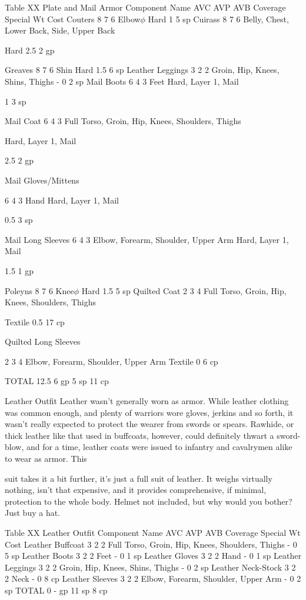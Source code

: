 \documentclass[oneside,11pt,english]{book}
\begin{document}
 
Table XX Plate and Mail Armor 
Component Name AVC AVP AVB Coverage Special Wt Cost 
Couters 8 7 6 Elbow$\phi$ Hard 1 5 sp 
Cuirass 8 7 6 Belly, Chest, Lower Back, Side, Upper 
Back 

Hard 2.5 2 gp 

Greaves 8 7 6 Shin Hard 1.5 6 sp 
Leather Leggings 3 2 2 Groin, Hip, Knees, Shins, Thighs - 0 2 sp 
Mail Boots 6 4 3 Feet Hard, Layer 1, 
Mail 

1 3 sp 

Mail Coat 6 4 3 Full Torso, Groin, Hip, Knees, Shoulders, 
Thighs 

Hard, Layer 1, 
Mail 

2.5 2 gp 

Mail 
Gloves/Mittens 

6 4 3 Hand Hard, Layer 1, 
Mail 

0.5 3 sp 

Mail Long Sleeves 6 4 3 Elbow, Forearm, Shoulder, Upper Arm Hard, Layer 1, 
Mail 

1.5 1 gp 

Poleyns 8 7 6 Knee$\phi$ Hard 1.5 5 sp 
Quilted Coat 2 3 4 Full Torso, Groin, Hip, Knees, Shoulders, 
Thighs 

Textile 0.5 17 cp 

Quilted Long 
Sleeves 

2 3 4 Elbow, Forearm, Shoulder, Upper Arm Textile 0 6 cp 

TOTAL 12.5 6 gp 
5 sp 
11 
cp 

 

Leather Outfit 
Leather wasn't generally worn as armor. While leather clothing was common enough, and plenty of 
warriors wore gloves, jerkins and so forth, it wasn't really expected to protect the wearer from swords or 
spears. Rawhide, or thick leather like that used in buffcoats, however, could definitely thwart a sword-
blow, and for a time, leather coats were issued to infantry and cavalrymen alike to wear as armor. This 


suit takes it a bit further, it's just a full suit of leather. It weighs virtually nothing, isn’t that expensive, and 
it provides comprehensive, if minimal, protection to the whole body. Helmet not included, but why would 
you bother? Just buy a hat. 

 
Table XX Leather Outfit 
Component Name AVC AVP AVB Coverage Special Wt Cost 
Leather Buffcoat 3 2 2 Full Torso, Groin, Hip, Knees, Shoulders, Thighs - 0 5 sp 
Leather Boots 3 2 2 Feet - 0 1 sp 
Leather Gloves 3 2 2 Hand - 0 1 sp 
Leather Leggings 3 2 2 Groin, Hip, Knees, Shins, Thighs - 0 2 sp 
Leather Neck-Stock 3 2 2 Neck - 0 8 cp 
Leather Sleeves 3 2 2 Elbow, Forearm, Shoulder, Upper Arm - 0 2 sp 
TOTAL 0 - gp 
11 sp 
8 cp 
\end{document}
